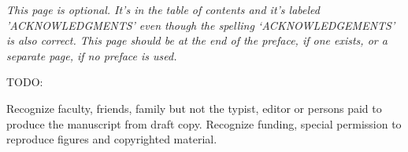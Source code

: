 {\footnotesize\em This page is optional.
It's in the table of contents and it's labeled 'ACKNOWLEDGMENTS' even
though the spelling `ACKNOWLEDGEMENTS' is also correct.
This page should be at the end of the preface, if one exists, or a
separate page, if no preface is used.}

TODO:

Recognize faculty, friends, family but not the typist, editor or persons
paid to produce the manuscript from draft copy. Recognize funding,
special permission to reproduce figures and copyrighted material.
